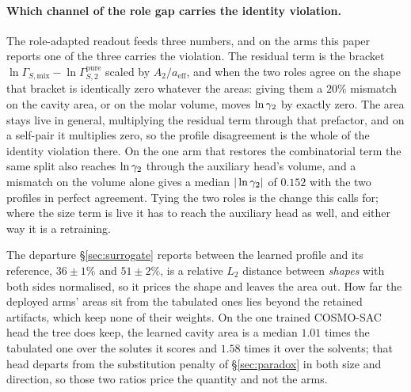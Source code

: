\paragraph{Which channel of the role gap carries the identity violation.} The role-adapted readout
feeds three numbers, and on the arms this paper reports one of the three carries the violation. The
residual term is the bracket $\ln\Gamma_{S,\mathrm{mix}}-\ln\Gamma_{S,2}^{\mathrm{pure}}$ scaled by
$A_2/a_{\mathrm{eff}}$, and when the two roles agree on the shape that bracket is identically zero
whatever the areas: giving them a $20\%$ mismatch on the cavity area, or on the molar volume, moves
$\ln\gamma_2$ by exactly zero. The area stays live in general, multiplying the residual term through that
prefactor, and on a self-pair it multiplies zero, so the profile disagreement is the whole of the
identity violation there. On the one arm that restores the combinatorial term the same split also
reaches $\ln\gamma_2$ through the auxiliary head's volume, and a mismatch on the volume alone gives a
median $|\ln\gamma_2|$ of $0.152$ with the two profiles in perfect agreement. Tying the two roles is the
change this calls for; where the size term is live it has to reach the auxiliary head as well, and
either way it is a retraining.

The departure \S\ref{sec:surrogate} reports between the learned profile and its reference,
$36\pm1\%$ and $51\pm2\%$, is a relative $L_2$ distance between \emph{shapes} with both sides
normalised, so it prices the shape and leaves the area out. How far the deployed arms' areas sit
from the tabulated ones lies beyond the retained artifacts, which keep none of their weights. On the
one trained COSMO-SAC head the tree does keep, the learned cavity area is a median $1.01$ times the
tabulated one over the solutes it scores and $1.58$ times it over the solvents; that head departs
from the substitution penalty of \S\ref{sec:paradox} in both size and direction, so those two ratios
price the quantity and not the arms.


